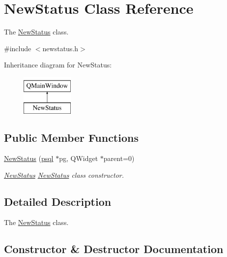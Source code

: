 \hypertarget{class_new_status}{}\section{New\+Status Class Reference}
\label{class_new_status}


The \hyperlink{class_new_status}{New\+Status} class.  




{\ttfamily \#include $<$newstatus.\+h$>$}

Inheritance diagram for New\+Status\+:\begin{figure}[H]
\begin{center}
\leavevmode
\includegraphics[height=2.000000cm]{class_new_status}
\end{center}
\end{figure}
\subsection*{Public Member Functions}
\begin{DoxyCompactItemize}
\item 
\hyperlink{class_new_status_a57acfb5d07cc3a3d1e33cd00a7c2ed72}{New\+Status} (\hyperlink{classpsql}{psql} $\ast$pg, Q\+Widget $\ast$parent=0)
\begin{DoxyCompactList}\small\item\em \hyperlink{class_new_status}{New\+Status} \hyperlink{class_new_status}{New\+Status} class constructor. \end{DoxyCompactList}\end{DoxyCompactItemize}


\subsection{Detailed Description}
The \hyperlink{class_new_status}{New\+Status} class. 

\subsection{Constructor \& Destructor Documentation}
\mbox{\label{class_new_status_a57acfb5d07cc3a3d1e33cd00a7c2ed72}} 
